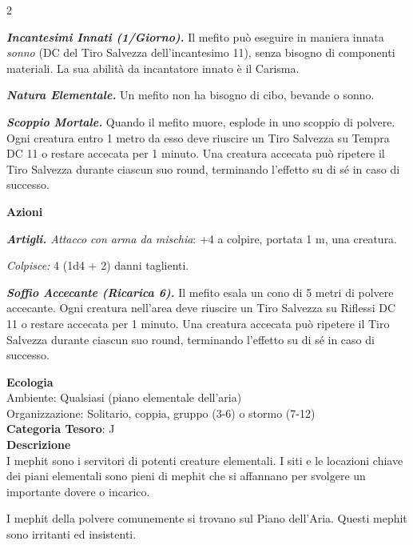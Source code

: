 \begin{multicols}{2}
{\emph{\textbf{Incantesimi Innati (1/Giorno).}} Il mefito può eseguire in maniera innata \emph{sonno} (DC del Tiro Salvezza dell'incantesimo 11), senza bisogno di componenti materiali. La sua abilità da incantatore innato è il Carisma.

\emph{\textbf{Natura Elementale.}} Un mefito non ha bisogno di cibo, bevande o sonno.

\emph{\textbf{Scoppio Mortale.}} Quando il mefito muore, esplode in uno scoppio di polvere. Ogni creatura entro 1 metro da esso deve riuscire un Tiro Salvezza su Tempra DC 11 o restare accecata per 1 minuto. Una creatura accecata può ripetere il Tiro Salvezza durante ciascun suo round, terminando l'effetto su di sé in caso di successo.

\textbf{Azioni}

\emph{\textbf{Artigli.} Attacco con arma da mischia}: +4 a colpire, portata 1 m, una creatura.

\emph{Colpisce:} 4 (1d4 + 2) danni taglienti.

\emph{\textbf{Soffio Accecante (Ricarica 6).}} Il mefito esala un cono di 5 metri di polvere accecante. Ogni creatura nell'area deve riuscire un Tiro Salvezza su Riflessi DC 11 o restare accecata per 1 minuto. Una creatura accecata può ripetere il Tiro Salvezza durante ciascun suo round, terminando l'effetto su di sé in caso di successo.

\textbf{Ecologia}\\
Ambiente: Qualsiasi (piano elementale dell'aria)\\
Organizzazione: Solitario, coppia, gruppo (3-6) o stormo (7-12)\\
\textbf{Categoria Tesoro}: J\\
\textbf{Descrizione}\\
I mephit sono i servitori di potenti creature elementali. I siti e le locazioni chiave dei piani elementali sono pieni di mephit che si affannano per svolgere un importante dovere o incarico.

I mephit della polvere comunemente si trovano sul Piano dell'Aria. Questi mephit sono irritanti ed insistenti.

}
\end{multicols}
